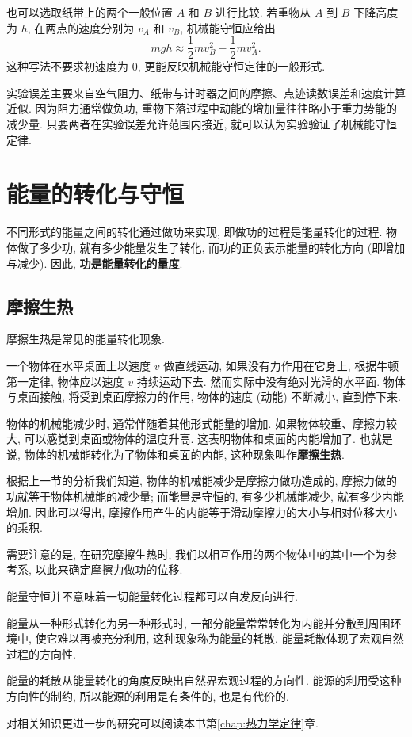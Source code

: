 \documentclass[UTF8,openany,fontset=fandol]{ctexbook}
\theoremstyle{chinesetextbook}
\begin{document}
也可以选取纸带上的两个一般位置 $A$ 和 $B$ 进行比较. 若重物从 $A$ 到 $B$ 下降高度为 $h$, 在两点的速度分别为 $v_A$ 和 $v_B$, 机械能守恒应给出
\[
mgh\approx\frac12mv_B^2-\frac12mv_A^2.
\]
这种写法不要求初速度为 0, 更能反映机械能守恒定律的一般形式.

实验误差主要来自空气阻力、纸带与计时器之间的摩擦、点迹读数误差和速度计算近似. 因为阻力通常做负功, 重物下落过程中动能的增加量往往略小于重力势能的减少量. 只要两者在实验误差允许范围内接近, 就可以认为实验验证了机械能守恒定律.
\section{能量的转化与守恒}
不同形式的能量之间的转化通过做功来实现, 即做功的过程是能量转化的过程. 物体做了多少功, 就有多少能量发生了转化, 而功的正负表示能量的转化方向 (即增加与减少). 因此, \textbf{功是能量转化的量度}.
\subsection{摩擦生热}
摩擦生热是常见的能量转化现象.

一个物体在水平桌面上以速度 $v$ 做直线运动, 如果没有力作用在它身上, 根据牛顿第一定律, 物体应以速度 $v$ 持续运动下去. 然而实际中没有绝对光滑的水平面. 物体与桌面接触, 将受到桌面摩擦力的作用, 物体的速度 (动能) 不断减小, 直到停下来.

物体的机械能减少时, 通常伴随着其他形式能量的增加. 如果物体较重、摩擦力较大, 可以感觉到桌面或物体的温度升高. 这表明物体和桌面的内能增加了. 也就是说, 物体的机械能转化为了物体和桌面的内能, 这种现象叫作\textbf{摩擦生热}.

根据上一节的分析我们知道, 物体的机械能减少是摩擦力做功造成的, 摩擦力做的功就等于物体机械能的减少量; 而能量是守恒的, 有多少机械能减少, 就有多少内能增加. 因此可以得出, 摩擦作用产生的内能等于滑动摩擦力的大小与相对位移大小的乘积.

需要注意的是, 在研究摩擦生热时, 我们以相互作用的两个物体中的其中一个为参考系, 以此来确定摩擦力做功的位移.

{\kaishu 能量守恒并不意味着一切能量转化过程都可以自发反向进行.}

能量从一种形式转化为另一种形式时, 一部分能量常常转化为内能并分散到周围环境中, 使它难以再被充分利用, 这种现象称为能量的耗散. 能量耗散体现了宏观自然过程的方向性.

能量的耗散从能量转化的角度反映出自然界宏观过程的方向性. 能源的利用受这种方向性的制约, 所以能源的利用是有条件的, 也是有代价的.

对相关知识更进一步的研究可以阅读本书第\ref{chap:热力学定律}章.
\end{document}
